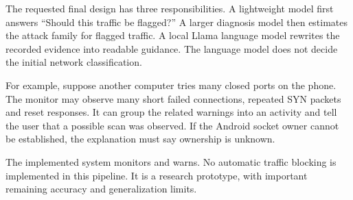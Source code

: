 \documentclass[11pt,a4paper,oneside]{report}
\begin{document}
The requested final design has three responsibilities. A lightweight model first answers ``Should this traffic be flagged?'' A larger diagnosis model then estimates the attack family for flagged traffic. A local Llama language model rewrites the recorded evidence into readable guidance. The language model does not decide the initial network classification.

For example, suppose another computer tries many closed ports on the phone. The monitor may observe many short failed connections, repeated SYN packets and reset responses. It can group the related warnings into an activity and tell the user that a possible scan was observed. If the Android socket owner cannot be established, the explanation must say ownership is unknown.

The implemented system monitors and warns. No automatic traffic blocking is implemented in this pipeline. It is a research prototype, with important remaining accuracy and generalization limits.
\end{document}
